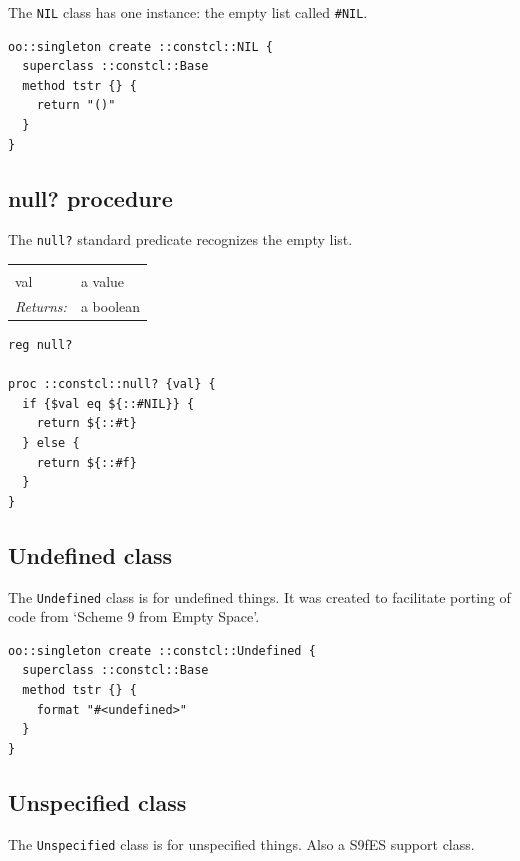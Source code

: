 \documentclass[a5paper,draft]{memoir}
\begin{document}
The \texttt{NIL} class has one instance: the empty list called \texttt{\#NIL}.

\begin{lstlisting}
oo::singleton create ::constcl::NIL {
  superclass ::constcl::Base
  method tstr {} {
    return "()"
  }
}
\end{lstlisting}

\subsection{null? procedure}
\label{null-procedure}

The \texttt{null?} standard predicate recognizes the empty list.

\noindent\begin{tabular}{ |p{1.9cm} p{6.5cm}| }
\hline
\rowcolor[HTML]{CCCCCC} \multicolumn{2}{|l|}{\textbf{null? (public)}} \\
val & a value \\
\textit{Returns:} & a boolean \\
\hline
\end{tabular}

\begin{lstlisting}
reg null?

proc ::constcl::null? {val} {
  if {$val eq ${::#NIL}} {
    return ${::#t}
  } else {
    return ${::#f}
  }
}
\end{lstlisting}

\subsection{Undefined class}
\label{undefined-class}

The \texttt{Undefined} class is for undefined things. It was created to facilitate porting of code from `Scheme 9 from Empty Space'.

\begin{lstlisting}
oo::singleton create ::constcl::Undefined {
  superclass ::constcl::Base
  method tstr {} {
    format "#<undefined>"
  }
}
\end{lstlisting}

\subsection{Unspecified class}
\label{unspecified-class}

The \texttt{Unspecified} class is for unspecified things. Also a S9fES support class.
\end{document}
